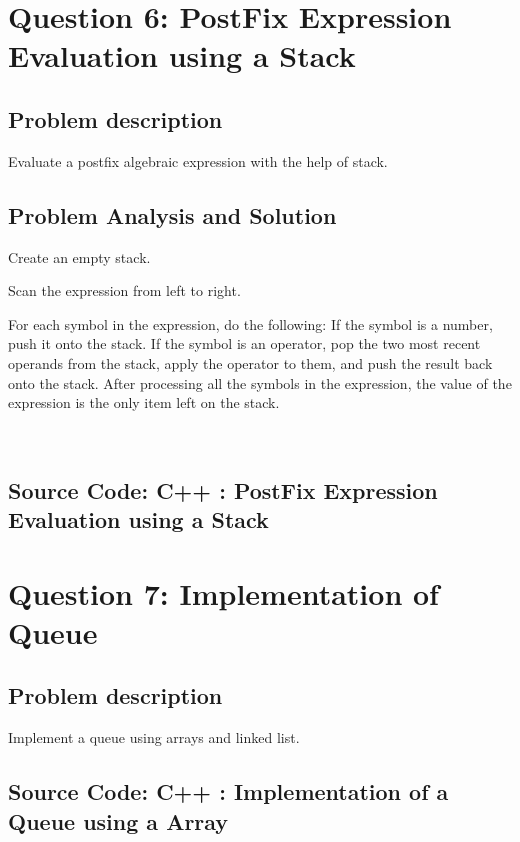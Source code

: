 \documentclass[a4paper]{article}
\begin{document}
\clearpage

\section{\hspace{-0.5em}\textbf{ Question 6}: PostFix Expression Evaluation using a Stack}
\subsection{Problem description}
\large
Evaluate a postfix algebraic expression with the help of stack.


\subsection{Problem Analysis and Solution}

\item Create an empty stack.
\item Scan the expression from left to right.
\item For each symbol in the expression, do the following:
If the symbol is a number, push it onto the stack.
If the symbol is an operator, pop the two most recent operands from the stack, apply the operator to them, and push the result back onto the stack.
After processing all the symbols in the expression, the value of the expression is the only item left on the stack.

\\

\subsection{Source Code: C++ : PostFix Expression Evaluation using a Stack}


\clearpage
\section{\hspace{-0.5em}\textbf{ Question 7}: Implementation of Queue}

\subsection{Problem description}
\large
Implement a queue using arrays and linked list.

\subsection{Source Code: C++ : Implementation of a Queue using a Array}

\end{document}
